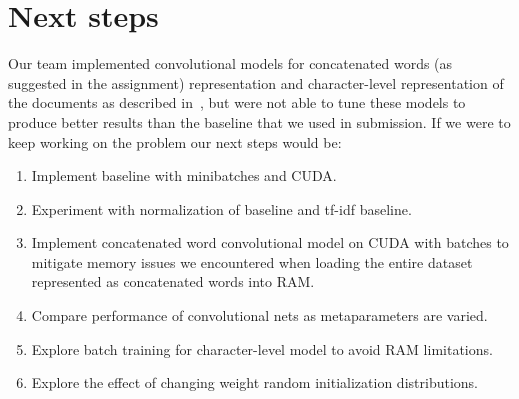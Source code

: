 \documentclass{article} %
\begin{document}
\section{Next steps}
\label{next}
Our team implemented convolutional models for concatenated words (as suggested in the assignment) representation and character-level representation of the documents as described in~\cite{zhang15}, but were not able to tune these models to produce better results than the baseline that we used in submission.
If we were to keep working on the problem our next steps would be:
\begin{enumerate}
\item Implement baseline with minibatches and CUDA.
\item Experiment with normalization of baseline and tf-idf baseline.
\item Implement concatenated word convolutional model on CUDA with batches to mitigate memory issues we encountered when loading 
the entire dataset represented as concatenated words into RAM.
\item Compare performance of convolutional nets as metaparameters are varied.
\item Explore batch training for character-level model to avoid RAM limitations.
\item Explore the effect of changing weight random initialization distributions.
\end{enumerate}

{}

\end{document}

